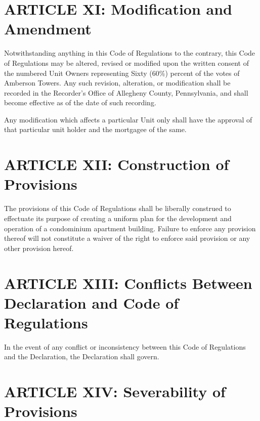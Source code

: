 \documentclass[
  14pt,
]{book}
\begin{document}
\hypertarget{article-xi-modification-and-amendment}{%
\section*{ARTICLE XI: Modification and Amendment}\label{article-xi-modification-and-amendment}}

Notwithstanding anything in this Code of Regulations to the contrary, this Code of Regulations may be altered, revised or modified upon the written consent of the numbered Unit Owners representing Sixty (60\%) percent of the votes of Amberson Towers. Any such revision, alteration, or modification shall be recorded in the Recorder's Office of Allegheny County, Pennsylvania, and shall become effective as of the date of such recording.

Any modification which affects a particular Unit only shall have the approval of that particular unit holder and the mortgagee of the same.

\hypertarget{article-xii-construction-of-provisions}{%
\section*{ARTICLE XII: Construction of Provisions}\label{article-xii-construction-of-provisions}}

The provisions of this Code of Regulations shall be liberally construed to effectuate its purpose of creating a uniform plan for the development and operation of a condominium apartment building. Failure to enforce any provision thereof will not constitute a waiver of the right to enforce said provision or any other provision hereof.

\hypertarget{article-xiii-conflicts-between-declaration-and-code-of-regulations}{%
\section*{ARTICLE XIII: Conflicts Between Declaration and Code of Regulations}\label{article-xiii-conflicts-between-declaration-and-code-of-regulations}}

In the event of any conflict or inconsistency between this Code of Regulations and the Declaration, the Declaration shall govern.

\hypertarget{article-xiv-severability-of-provisions}{%
\section*{ARTICLE XIV: Severability of Provisions}\label{article-xiv-severability-of-provisions}}
\end{document}
